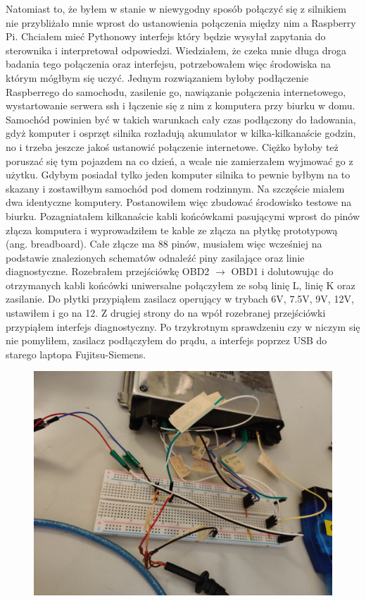 \documentclass[declaration,shortabstract, inz]{iithesis}
\begin{document}
    Natomiast to, że byłem w stanie w niewygodny sposób połączyć się z silnikiem nie przybliżało mnie wprost do ustanowienia połączenia między nim a Raspberry Pi.
    Chciałem mieć Pythonowy interfejs który będzie wysyłał zapytania do sterownika i interpretował odpowiedzi. Wiedziałem, że czeka mnie długa droga badania tego połączenia oraz interfejsu, potrzebowałem więc środowiska na którym mógłbym się uczyć. Jednym rozwiązaniem byłoby podłączenie Raspberrego do samochodu, zasilenie go, nawiązanie połączenia internetowego, wystartowanie serwera ssh i łączenie się z nim z komputera przy biurku w domu. Samochód powinien być w takich warunkach cały czas podłączony do ładowania, gdyż komputer i osprzęt silnika rozładują akumulator w kilka-kilkanaście godzin, no i trzeba jeszcze jakoś ustanowić połączenie internetowe. Ciężko byłoby też poruszać się tym pojazdem na co dzień, a wcale nie zamierzałem wyjmować go z użytku. Gdybym posiadał tylko jeden komputer silnika to pewnie byłbym na to skazany i zostawiłbym samochód pod domem rodzinnym. Na szczęście miałem dwa identyczne komputery. Postanowiłem więc zbudować środowisko testowe na biurku. Pozagniatałem kilkanaście kabli końcówkami pasującymi wprost do pinów złącza komputera i wyprowadziłem te kable ze złącza na płytkę prototypową (ang. breadboard). Całe złącze ma 88 pinów, musiałem więc wcześniej na podstawie znalezionych schematów odnaleźć piny zasilające oraz linie diagnostyczne. Rozebrałem przejściówkę OBD2 $\rightarrow$ OBD1 i dolutowując do otrzymanych kabli końcówki uniwersalne połączyłem ze sobą linię L, linię K oraz zasilanie. Do płytki przypiąłem zasilacz operujący w trybach 6V, 7.5V, 9V, 12V, ustawiłem i go na 12. Z drugiej strony do na wpół rozebranej przejściówki przypiąłem interfejs diagnostyczny. Po trzykrotnym sprawdzeniu czy w niczym się nie pomyliłem, zasilacz podłączyłem do prądu, a interfejs poprzez USB do starego laptopa Fujitsu-Siemens.
    
    \begin{figure}[htp]
        \centering
        \includegraphics[width=12cm]{images/test_setup_close.jpg}
        \label{fig:test_setup_close}
    \end{figure}
    \FloatBarrier
    
\end{document}

